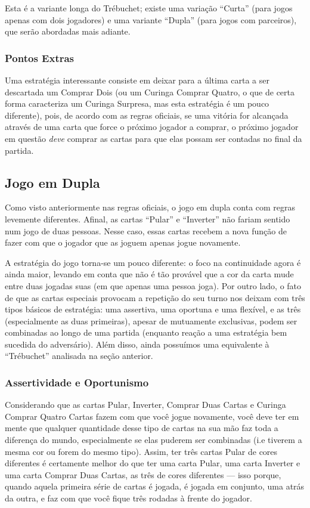 Esta é a variante longa do Trébuchet; existe uma variação ``Curta'' (para jogos apenas com dois jogadores) e uma variante ``Dupla'' (para jogos com parceiros), que serão abordadas mais adiante.

\subsubsection{Pontos Extras}

Uma estratégia interessante consiste em deixar para a última carta a ser descartada um Comprar Dois (ou um Curinga Comprar Quatro, o que de certa forma caracteriza um Curinga Surpresa, mas esta estratégia é um pouco diferente), pois, de acordo com as regras oficiais, se uma vitória for alcançada através de uma carta que force o próximo jogador a comprar, o próximo jogador em questão \emph{deve} comprar as cartas para que elas possam ser contadas no final da partida.

\subsection{Jogo em Dupla}

Como visto anteriormente nas regras oficiais, o jogo em dupla conta com regras levemente diferentes. Afinal, as cartas ``Pular'' e ``Inverter'' não fariam sentido num jogo de duas pessoas. Nesse caso, essas cartas recebem a nova função de fazer com que o jogador que as joguem apenas jogue novamente.

A estratégia do jogo torna-se um pouco diferente: o foco na continuidade agora é ainda maior, levando em conta que não é tão provável que a cor da carta mude entre duas jogadas suas (em que apenas uma pessoa joga). Por outro lado, o fato de que as cartas especiais provocam a repetição do seu turno nos deixam com três tipos básicos de estratégia: uma assertiva, uma oportuna e uma flexível, e as três (especialmente as duas primeiras), apesar de mutuamente exclusivas, podem ser combinadas ao longo de uma partida (enquanto reação a uma estratégia bem sucedida do adversário). Além disso, ainda possuímos uma equivalente à ``Trébuchet'' analisada na seção anterior.

\subsubsection{Assertividade e Oportunismo}

Considerando que as cartas Pular, Inverter, Comprar Duas Cartas e Curinga Comprar Quatro Cartas fazem com que você jogue novamente, você deve ter em mente que qualquer quantidade desse tipo de cartas na sua mão faz toda a diferença do mundo, especialmente se elas puderem ser combinadas (i.e tiverem a mesma cor ou forem do mesmo tipo). Assim, ter três cartas Pular de cores diferentes é certamente melhor do que ter uma carta Pular, uma carta Inverter e uma carta Comprar Duas Cartas, as três de cores diferentes --- isso porque, quando aquela primeira série de cartas é jogada, é jogada em conjunto, uma atrás da outra, e faz com que você fique três rodadas à frente do jogador.

